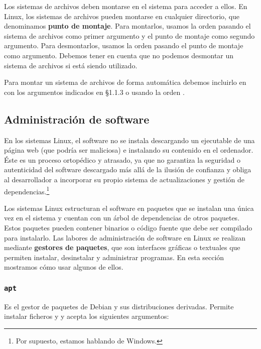 Los sistemas de archivos deben montarse en el sistema para acceder a ellos.
En Linux, los sistemas de archivos pueden montarse en cualquier directorio, que denominamos \textbf{punto de montaje}.
Para montarlos, usamos la orden  pasando el sistema de archivos como primer argumento y el punto de montaje como segundo argumento.
Para desmontarlos, usamos la orden  pasando el punto de montaje como argumento.
Debemos tener en cuenta que no podemos desmontar un sistema de archivos si está siendo utilizado.

Para montar un sistema de archivos de forma automática debemos incluirlo en  con los argumentos indicados en \S1.1.3 o usando la orden .

\subsection{Administración de software}

En los sistemas Linux, el software no se instala descargando un ejecutable de una página web (que podría ser maliciosa) e instalando su contenido en el ordenador.
Éste es un proceso ortopédico y atrasado, ya que no garantiza la seguridad o autenticidad del software descargado más allá de la ilusión de confianza y obliga al desarrollador a incorporar su propio sistema de actualizaciones y gestión de dependencias.\footnote{Por supuesto, estamos hablando de Windows.}

Los sistemas Linux estructuran el software en paquetes que se instalan una única vez en el sistema y cuentan con un árbol de dependencias de otros paquetes.
Estos paquetes pueden contener binarios o código fuente que debe ser compilado para instalarlo.
Las labores de administración de software en Linux se realizan mediante \textbf{gestores de paquetes}, que son interfaces gráficas o textuales que permiten instalar, desinstalar y administrar programas.
En esta sección mostramos cómo usar algunos de ellos.

\subsubsection{\texttt{apt}}

Es el gestor de paquetes de Debian y sus distribuciones derivadas.
Permite instalar ficheros  y  y acepta los siguientes argumentos:

